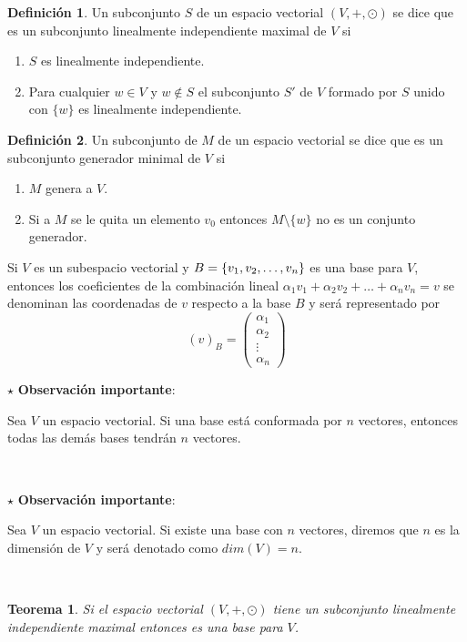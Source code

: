 \documentclass[10pt,a4paper]{report}
\newtheorem{theorem}{Teorema}[chapter]
\theoremstyle{definition}
\newtheorem{dfn}{Definición}[chapter]
\theoremstyle{remark}
\numberwithin{section}{chapter}
\numberwithin{equation}{chapter}
\numberwithin{tacounter}{chapter}
\newenvironment{obsimp}[0]
    {\noindent$\star$ \textbf{Observación importante}:
  \itshape
    }
    { 
    \\
    }
\begin{document}
\begin{dfn}
Un subconjunto $S$ de un espacio vectorial $(V, +, \odot)$ se dice que es un subconjunto linealmente independiente maximal de $V$ si\\
\begin{enumerate}
\item $S$ es linealmente independiente.
\item Para cualquier $w \in V$ y $w \notin S$ el subconjunto $S'$ de $V$ formado por $S$ unido con $\{w\}$ es linealmente independiente.
\end{enumerate}
\end{dfn}

\begin{dfn}
Un subconjunto de $M$ de un espacio vectorial se dice que es un subconjunto generador minimal de $V$ si
\begin{enumerate}
\item $M$ genera a $V$.
\item Si a $M$ se le quita un elemento $v_0$ entonces $M \setminus \{w\}$ no es un conjunto generador.
\end{enumerate}
\end{dfn}

Si $V$ es un subespacio vectorial y $B =  \lbrace v_1, v_2, \ldots, v_n \rbrace$ es una base para $V$, entonces los coeficientes de la combinación lineal $\alpha_1 v_1 + \alpha_2 v_2 + \ldots + \alpha_n v_n = v$ se denominan las coordenadas de $v$ respecto a la base $B$ y será representado por 
$$(v)_B = \left( \begin{array}{c}
\alpha_1\\
\alpha_2\\
\vdots\\
\alpha_n  \end{array} \right)$$

\begin{obsimp}
Sea $V$ un espacio vectorial. Si una base está conformada por $n$ vectores, entonces todas las demás bases tendrán $n$ vectores.
\end{obsimp}

\begin{obsimp}
Sea $V$ un espacio vectorial. Si existe una base con $n$ vectores, diremos que $n$ es la dimensión de $V$ y será denotado como $dim (V) = n$.
\end{obsimp}

\begin{theorem}
Si el espacio vectorial $(V , + , \odot)$ tiene un subconjunto linealmente independiente maximal  entonces es una base para $V$.

\end{theorem}
\end{document}
